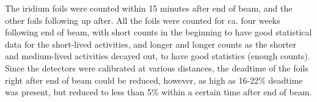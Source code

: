 \noindent 
The iridium foils were counted within 15 minutes after end of beam, and the other foils following up after. All the foils were counted for ca. four weeks following end of beam, with short counts in the beginning to have good statistical data for the short-lived activities, and longer and longer counts as the shorter and medium-lived activities decayed out, to have good statistics (enough counts). Since the detectors were calibrated at various distances, the deadtime of the foils right after end of beam could be reduced, however, as high as  16-22\% deadtime was present, but reduced to less than 5\% within a certain time after end of beam. 

